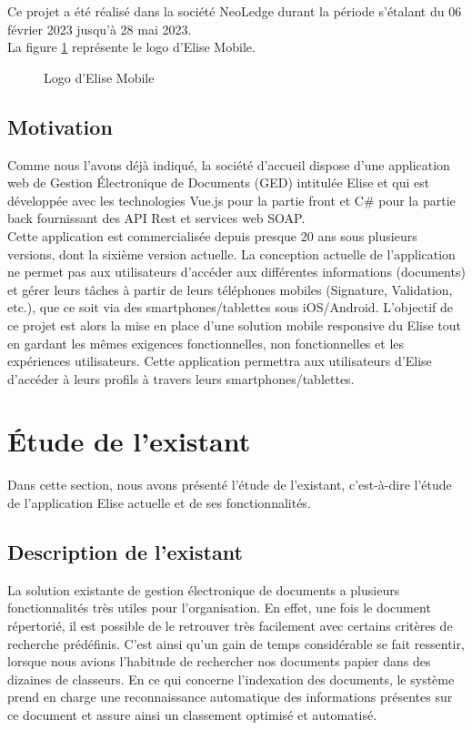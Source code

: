 Ce projet a été réalisé dans la société NeoLedge durant la période s'étalant du 06 février 2023 jusqu'à 28 mai 2023.\\

La figure \ref{fig:logoEliseMobile} représente le logo d'Elise Mobile.\\

\begin{figure}[H]
\centering
{}
\caption{Logo d'Elise Mobile}
\label{fig:logoEliseMobile}
\end{figure}

\subsection{Motivation}
Comme nous l'avons déjà indiqué, la société d'accueil dispose d'une application web de Gestion Électronique de Documents (GED) intitulée Elise et qui est développée avec les technologies Vue.js pour la partie front et C\# pour la partie back fournissant des API Rest et services web SOAP.\\
Cette application est commercialisée depuis presque 20 ans sous plusieurs versions, dont la sixième version actuelle. La conception actuelle de l'application ne permet pas aux utilisateurs d'accéder aux différentes informations (documents) et gérer leurs tâches à partir de leurs téléphones mobiles (Signature, Validation, etc.), que ce soit via des smartphones/tablettes sous iOS/Android.
L'objectif de ce projet est alors la mise en place d'une solution mobile responsive du Elise tout en gardant les mêmes exigences fonctionnelles, non fonctionnelles et les expériences utilisateurs. Cette application permettra aux utilisateurs d'Elise d'accéder à leurs profils à travers leurs smartphones/tablettes.

\section{Étude de l'existant}
Dans cette section, nous avons présenté l'étude de l'existant, c'est-à-dire l'étude de l'application Elise actuelle et de ses fonctionnalités.
\subsection{Description de l'existant}
La solution existante de gestion électronique de documents a plusieurs fonctionnalités très utiles pour l'organisation. En effet, une fois le document répertorié, il est possible de le retrouver très facilement avec certains critères de recherche prédéfinis. C'est ainsi qu'un gain de temps considérable se fait ressentir, lorsque nous avions l'habitude de rechercher nos documents papier dans des dizaines de classeurs. En ce qui concerne l'indexation des documents, le système prend en charge une reconnaissance automatique des informations présentes sur ce document et assure ainsi un classement optimisé et automatisé.

